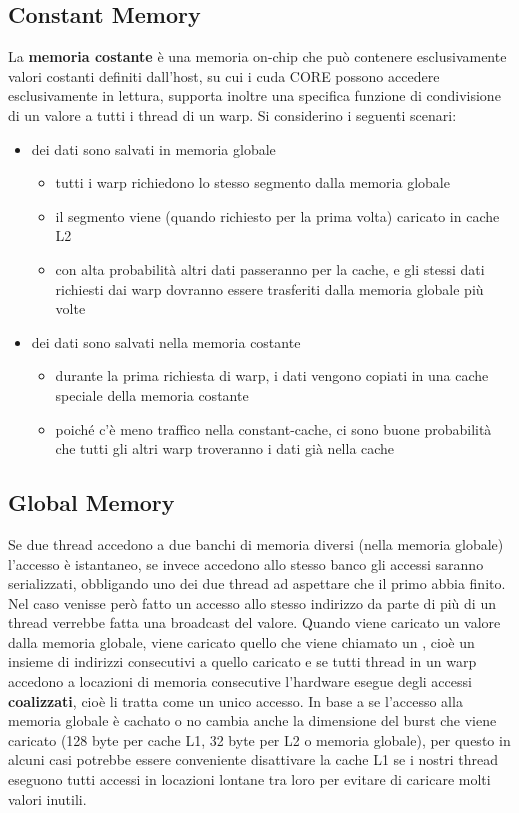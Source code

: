 \documentclass[10pt, letterpaper]{report}
\begin{document}
\subsection{Constant Memory}
La \textbf{memoria costante} è una memoria on-chip che può contenere esclusivamente valori costanti definiti dall'host, su cui i cuda CORE possono accedere esclusivamente in lettura, supporta inoltre una specifica funzione di condivisione di un valore a tutti i thread di un warp.
Si considerino i seguenti scenari:\begin{itemize}
    \item dei dati sono salvati in memoria globale \begin{itemize}
        \item tutti i warp richiedono lo stesso segmento dalla memoria globale 
        \item il segmento viene (quando richiesto per la prima volta) caricato in cache L2 
        \item con alta probabilità altri dati passeranno per la cache, e gli stessi dati richiesti dai warp dovranno essere trasferiti dalla memoria globale più volte 
    \end{itemize}
    \item dei dati sono salvati nella memoria costante\begin{itemize}
        \item durante la prima richiesta di warp, i dati vengono copiati in una cache speciale della memoria costante 
        \item poiché c'è meno traffico nella constant-cache, ci sono buone probabilità che tutti gli altri
        warp troveranno i dati già nella cache
    \end{itemize}
\end{itemize}




\subsection{Global Memory}
Se due thread accedono a due banchi di memoria diversi (nella memoria globale) l'accesso è istantaneo, se invece accedono allo stesso banco gli accessi saranno serializzati, obbligando uno dei due thread ad aspettare
che il primo abbia finito. Nel caso venisse però fatto un accesso allo stesso indirizzo da parte
di più di un thread verrebbe fatta una broadcast del valore.\acc
Quando viene caricato un valore dalla memoria globale, viene caricato quello che viene chiamato un , cioè un insieme di indirizzi consecutivi a quello caricato e se tutti thread in
un warp accedono a locazioni di memoria consecutive l'hardware esegue degli 
accessi \textbf{coalizzati}, cioè
li tratta come un unico accesso.\acc
In base a se l'accesso alla memoria globale è cachato o no cambia anche la dimensione del burst
che viene caricato (128 byte per cache L1, 32 byte per L2 o memoria globale), per questo in
alcuni casi potrebbe essere conveniente disattivare la cache L1 se i nostri thread eseguono tutti
accessi in locazioni lontane tra loro per evitare di caricare molti valori inutili.
\end{document}
